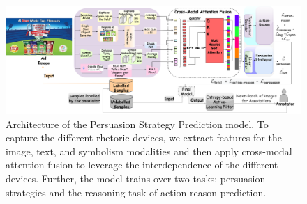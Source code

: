 \begin{landscape}
    
\begin{figure}
        \centering
        \includegraphics[width=1.5\textwidth]{images/Persuasion-Arch-Diag-Copy-of-Model_Architecture-Page-2.drawio.png}
        \caption{\small Architecture of the Persuasion Strategy Prediction model. To capture the different rhetoric devices, we extract features for the image, text, and symbolism modalities and then apply cross-modal attention fusion to leverage the interdependence of the different devices. Further, the model trains over two tasks: persuasion strategies and the reasoning task of action-reason prediction.}
\label{fig:arch_diag}
\end{figure}
\end{landscape}



